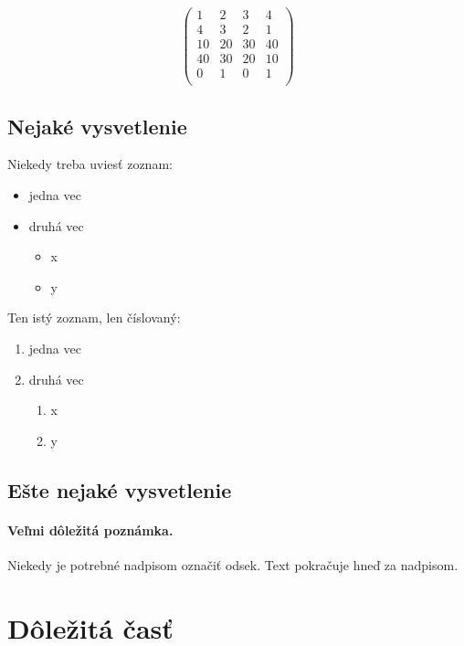 \documentclass[10pt,twocolumn,twoside,slovak,a4paper]{article}
\begin{document}
\begin{equation}
\begin{pmatrix}
1 & 2 & 3 & 4 \\
4 & 3 & 2 & 1 \\
10 & 20 & 30 & 40 \\
40 & 30 & 20 & 10 \\
0 & 1 & 0 & 1 \\
\end{pmatrix}
\end{equation}


\subsection{Nejaké vysvetlenie} \label{ina:nejake}

Niekedy treba uviesť zoznam:

\begin{itemize}
\item jedna vec\cite{Coplien:MPD}
\item druhá vec
	\begin{itemize}
	\item x
	\item y
	\end{itemize}
\end{itemize}

Ten istý zoznam, len číslovaný:

\begin{enumerate}
\item jedna vec
\item druhá vec
	\begin{enumerate}
	\item x
	\item y
	\end{enumerate}
\end{enumerate}


\subsection{Ešte nejaké vysvetlenie} \label{ina:este}

\paragraph{Veľmi dôležitá poznámka.}
Niekedy je potrebné nadpisom označiť odsek. Text pokračuje hneď za nadpisom.



\section{Dôležitá časť} \label{dolezita}
\end{document}

